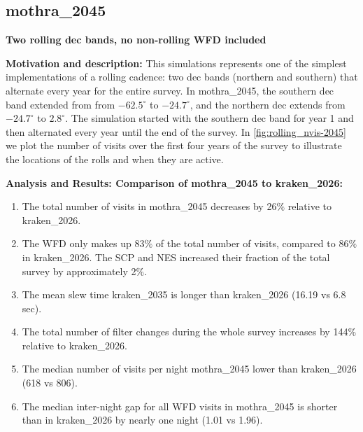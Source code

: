 \documentclass[DM,authoryear,toc]{lsstdoc}
\begin{document}
\subsection{mothra\_2045} \label{mothra2045}

\textbf{Two rolling dec bands, no non-rolling WFD included}

\textbf{Motivation and description:} This simulations represents one of the simplest implementations of a rolling cadence:
two dec bands (northern and southern) that alternate every year for the entire survey. In mothra\_2045, the southern dec band extended from
from $-62.5^{\circ}$ to $-24.7^{\circ}$, and the northern dec extends from $-24.7^{\circ}$ to $2.8^{\circ}$. The simulation started with
the southern dec band for year 1 and then alternated every year until the end of the survey. In \autoref{fig:rolling_nvis-2045}
we plot the number of visits over the first four years of the survey to illustrate the locations of the rolls and when they are active.

\textbf{Analysis and Results: Comparison of mothra\_2045 to kraken\_2026:}

\begin{enumerate}
\item The total number of visits in mothra\_2045 decreases by 26$\%$ relative to kraken\_2026.
\item The WFD only makes up 83$\%$ of the total number of visits, compared to 86$\%$ in kraken\_2026.
The SCP and NES increased their fraction of the total survey by approximately 2$\%$.
\item The mean slew time kraken\_2035 is longer than kraken\_2026 (16.19 vs 6.8 sec).
\item The total number of filter changes during the whole survey increases by 144$\%$ relative to kraken\_2026.
\item The median number of visits per night mothra\_2045 lower than kraken\_2026 (618 vs 806).
\item The median inter-night gap for all WFD visits in mothra\_2045 is shorter than in kraken\_2026 by nearly one night (1.01 vs 1.96).
\end{enumerate}
\end{document}
